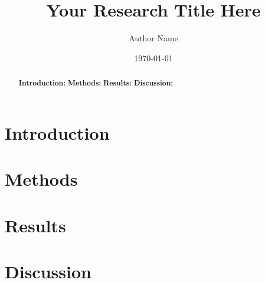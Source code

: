 \documentclass{article}
\title{Your Research Title Here}
\author{Author Name}
\date{\today}
\begin{document}
\maketitle

\begin{abstract}
\textbf{Introduction:} \lipsum[1] %
\textbf{Methods:} \lipsum[2] %
\textbf{Results:} \lipsum[3] %
\textbf{Discussion:} \lipsum[4] %
\end{abstract}

\section{Introduction}

\lipsum[1] %

\section{Methods}

\lipsum[2] %

\section{Results}

\lipsum[3] %

\section{Discussion}

\lipsum[4] %
\end{document}
